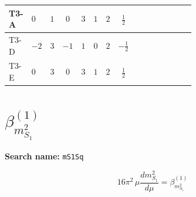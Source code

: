 \documentclass[8pt]{article}
\begin{document}
\begin{landscape}
\begin{longtable}{@{}llcccccc >{\raggedright\arraybackslash}p{0.21\linewidth} >{\raggedright\arraybackslash}p{0.21\linewidth} >{\raggedright\arraybackslash}p{0.21\linewidth}@{}}
\midrule
T3-A & $0$ & $1$ & $0$ & $3$ & $1$ & $2$ & $\frac{1}{2}$ & \scriptsize\adjustbox{max width=\linewidth}{$\begin{gathered} +\frac{3}{2} \left({Y_e}\,\left({Y_e}\right)^{\dagger}\,{Y_e}\right)_{ij}\end{gathered}$} & \scriptsize\adjustbox{max width=\linewidth}{$\begin{gathered} -\frac{9}{4} {g_2}^2 \left({Y_e}\right)_{ij}\end{gathered}$} & \scriptsize\adjustbox{max width=\linewidth}{$\begin{gathered} -\frac{15}{4} {g_Y}^2 \left({Y_e}\right)_{ij}\end{gathered}$} \\
\midrule
T3-D & $-2$ & $3$ & $-1$ & $1$ & $0$ & $2$ & $-\frac{1}{2}$ & \scriptsize\adjustbox{max width=\linewidth}{$\begin{gathered} +\frac{3}{2} \left({Y_e}\,\left({Y_e}\right)^{\dagger}\,{Y_e}\right)_{ij}\end{gathered}$} & \scriptsize\adjustbox{max width=\linewidth}{$\begin{gathered} -\frac{9}{4} {g_2}^2 \left({Y_e}\right)_{ij}\end{gathered}$} & \scriptsize\adjustbox{max width=\linewidth}{$\begin{gathered} -\frac{15}{4} {g_Y}^2 \left({Y_e}\right)_{ij}\end{gathered}$} \\
\midrule
T3-E & $0$ & $3$ & $0$ & $3$ & $1$ & $2$ & $\frac{1}{2}$ & \scriptsize\adjustbox{max width=\linewidth}{$\begin{gathered} +\frac{3}{2} \left({Y_e}\,\left({Y_e}\right)^{\dagger}\,{Y_e}\right)_{ij}\end{gathered}$} & \scriptsize\adjustbox{max width=\linewidth}{$\begin{gathered} -\frac{9}{4} {g_2}^2 \left({Y_e}\right)_{ij}\end{gathered}$} & \scriptsize\adjustbox{max width=\linewidth}{$\begin{gathered} -\frac{15}{4} {g_Y}^2 \left({Y_e}\right)_{ij}\end{gathered}$} \\
\midrule
\bottomrule
\end{longtable}
\clearpage
\section*{$\beta_{m_{S_1}^2}^{(1)}$}
\noindent\textbf{Search name: }\texttt{mS1Sq}\par\smallskip
\[16\pi^2\,\mu\frac{d m_{S_1}^2}{d\mu}=\beta_{m_{S_1}^2}^{(1)}\]

\end{landscape}
\end{document}
